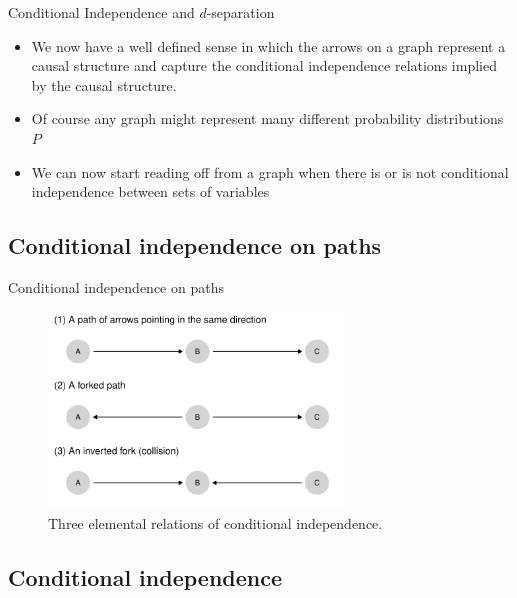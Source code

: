 \documentclass[
  11pt,
  ignorenonframetext,
]{beamer}
\begin{document}
\begin{frame}{Conditional Independence and \(d\)-separation}
\begin{itemize}
\item
  We now have a well defined sense in which the arrows on a graph
  represent a causal structure and capture the conditional independence
  relations implied by the causal structure.
\item
  Of course any graph might represent many different probability
  distributions \(P\)
\item
  We can now start reading off from a graph when there is or is not
  conditional independence between sets of variables
\end{itemize}
\end{frame}

\hypertarget{conditional-independence-on-paths}{%
\subsection{Conditional independence on
paths}\label{conditional-independence-on-paths}}

\begin{frame}{Conditional independence on paths}
\begin{figure}

{\centering \includegraphics[width=0.7\textwidth,height=\textheight]{0_lectures_files/figure-beamer/HJ-F-2-4-1.pdf}

}

\caption{Three elemental relations of conditional independence.}

\end{figure}
\end{frame}

\hypertarget{conditional-independence-1}{%
\subsection{Conditional independence}\label{conditional-independence-1}}
\end{document}

